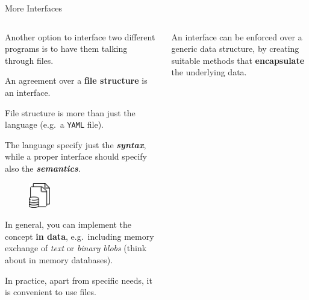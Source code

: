 \documentclass[9pt]{beamer}
\begin{document}
\begin{frame}[fragile]{More Interfaces}
    \vspace*{20pt}
    \begin{columns}
        \begin{column}{0.5\textwidth}
            Another option to interface two different programs is to have them
            talking through files.\newline

            An agreement over a \textbf{file structure} is an interface.
            \begin{flushright}
                \footnotesize
                File structure is more than just the language (e.g.\ a
                \texttt{YAML} file).

                \hspace*{10em} The language specify just the
                \textbf{\textit{syntax}}, while a proper interface should
                specify also the \textbf{\textit{semantics}}.
            \end{flushright}

            \begin{figure}
                \centering
                \includegraphics[width=0.2\textwidth]{data-file}
            \end{figure}

            In general, you can implement the concept \alert{\textbf{in data}},
            e.g.\ including memory exchange of \textit{text} or \textit{binary
            blobs} (think about in memory databases).

            \begin{flushright}
                \footnotesize
                In practice, apart from specific needs, it is convenient to use
                files.
            \end{flushright}
        \end{column}
        \begin{column}{0.5\textwidth}
            An interface can be enforced over a generic data structure, by
            creating suitable methods that \textbf{encapsulate} the underlying
            data.


\end{column}
\end{columns}
\end{frame}
\end{document}
